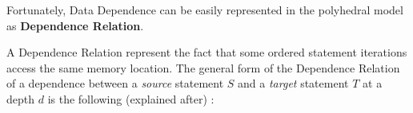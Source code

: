 \documentclass[paper=a4, fontsize=11.5pt]{scrartcl}
\numberwithin{equation}{section}        %
\numberwithin{figure}{section}          %
\numberwithin{table}{section}               %
\begin{document}
        Fortunately, Data Dependence can be easily represented in the polyhedral model as
        \textbf{Dependence Relation}.

        A Dependence Relation represent the fact that some ordered statement iterations
        access the same memory location. The general form of the Dependence Relation of
        a dependence between a \textit{source} statement $S$ and a \textit{target}
        statement $T$ at a depth $d$ is the following (explained after) :

        \begin{center}
\end{center}
\end{document}
